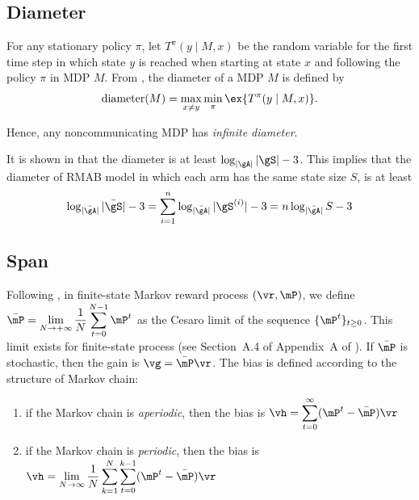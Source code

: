 \subsection{Diameter}

For any stationary policy $\pi$, let $T^\pi(y \mid M, x)$ be the random variable for the first time step in which state $y$ is reached when starting at state $x$ and following the policy $\pi$ in MDP $M$.
From \cite[Definition 1]{jaksch2010near}, the diameter of a MDP $M$ is defined by
\begin{align*}
    \mathrm{diameter}(M) = \max_{x\neq y}\min_{\pi} \ex{T^\pi(y\mid M, x)}.
\end{align*}

Hence, any noncommunicating MDP has \emph{infinite diameter}.

It is shown in \cite[Appendix A]{jaksch2010near} that the diameter is at least $\log_{|\gA|}|\gS|-3$.
This implies that the diameter of RMAB model in which each arm has the same state size $S$, is at least
\begin{equation*}
    \log_{|\bar{\gA}|}|\bar{\gS}| -3 = \sum_{i=1}^{n}\log_{|\bar{\gA}|}|\gS^{(i)}| -3 =n\log_{|\bar{\gA}|}S -3
\end{equation*}

\subsection{Span}


Following \cite[Chapter~8]{puterman2014markov}, in finite-state Markov reward process $(\vr, \mP)$, we define $\bar{\mP}=\displaystyle\lim_{N\to+\infty}\frac1N\sum_{t=0}^{N-1}\mP^{t}$ as the Cesaro limit of the sequence $\{\mP^t\}_{t\ge0}$.
This limit exists for finite-state process (see Section~A.4 of Appendix~A of \cite{puterman2014markov}).
If $\bar{\mP}$ is stochastic, then the gain is $\vg=\bar{\mP}\vr$.
The bias is defined according to the structure of Markov chain:
\begin{enumerate}
    \item if the Markov chain is \emph{aperiodic}, then the bias is $\vh=\displaystyle\sum_{t=0}^\infty(\mP^t-\bar{\mP})\vr$
    \item if the Markov chain is \emph{periodic}, then the bias is $\vh=\displaystyle\lim_{N\to\infty}\frac1N\sum_{k=1}^N\sum_{t=0}^{k-1}(\mP^t-\bar{\mP})\vr$
\end{enumerate}

